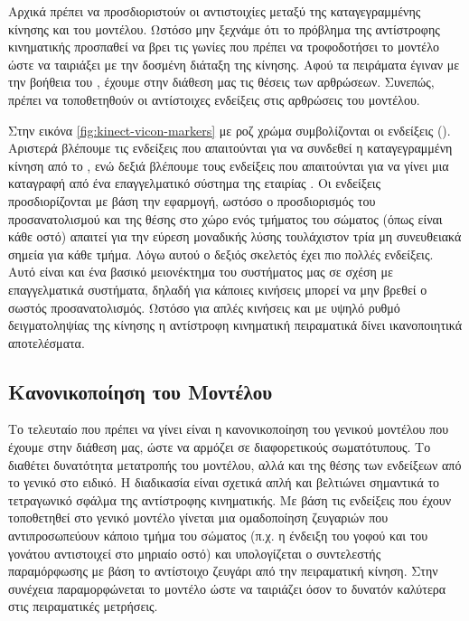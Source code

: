 Αρχικά πρέπει να προσδιοριστούν οι αντιστοιχίες μεταξύ της καταγεγραμμένης κίνησης και του μοντέλου. Ωστόσο μην ξεχνάμε ότι το πρόβλημα της αντίστροφης κινηματικής προσπαθεί να βρει τις γωνίες που πρέπει να τροφοδοτήσει το μοντέλο ώστε να ταιριάξει με την δοσμένη διάταξη της κίνησης. Αφού τα πειράματα έγιναν με την βοήθεια του , έχουμε στην διάθεση μας τις θέσεις των αρθρώσεων. Συνεπώς, πρέπει να τοποθετηθούν οι αντίστοιχες ενδείξεις στις αρθρώσεις του μοντέλου.

Στην εικόνα \ref{fig:kinect-vicon-markers} με ροζ χρώμα συμβολίζονται οι ενδείξεις (). Αριστερά βλέπουμε τις ενδείξεις που απαιτούνται για να συνδεθεί η καταγεγραμμένη κίνηση από το , ενώ δεξιά βλέπουμε τους ενδείξεις που απαιτούνται για να γίνει μια καταγραφή από ένα επαγγελματικό σύστημα της εταιρίας . Οι ενδείξεις προσδιορίζονται με βάση την εφαρμογή, ωστόσο ο προσδιορισμός του προσανατολισμού και της θέσης στο χώρο ενός τμήματος του σώματος (όπως είναι κάθε οστό) απαιτεί για την εύρεση μοναδικής λύσης τουλάχιστον τρία μη συνευθειακά σημεία για κάθε τμήμα. Λόγω αυτού ο δεξιός σκελετός έχει πιο πολλές ενδείξεις. Αυτό είναι και ένα βασικό μειονέκτημα του συστήματος μας σε σχέση με επαγγελματικά συστήματα, δηλαδή για κάποιες κινήσεις μπορεί να μην βρεθεί ο σωστός προσανατολισμός. Ωστόσο για απλές κινήσεις και με υψηλό ρυθμό δειγματοληψίας της κίνησης η αντίστροφη κινηματική πειραματικά δίνει ικανοποιητικά αποτελέσματα.

\subsection{Κανονικοποίηση του Μοντέλου}

Το τελευταίο που πρέπει να γίνει είναι η κανονικοποίηση του γενικού μοντέλου που έχουμε στην διάθεση μας, ώστε να αρμόζει σε διαφορετικούς σωματότυπους. Το  διαθέτει δυνατότητα μετατροπής του μοντέλου, αλλά και της θέσης των ενδείξεων από το γενικό στο ειδικό. Η διαδικασία είναι σχετικά απλή και βελτιώνει σημαντικά το τετραγωνικό σφάλμα της αντίστροφης κινηματικής. Με βάση τις ενδείξεις που έχουν τοποθετηθεί στο γενικό μοντέλο γίνεται μια ομαδοποίηση ζευγαριών που αντιπροσωπεύουν κάποιο τμήμα του σώματος (π.χ. η ένδειξη του γοφού και του γονάτου αντιστοιχεί στο μηριαίο οστό) και υπολογίζεται ο συντελεστής παραμόρφωσης με βάση το αντίστοιχο ζευγάρι από την πειραματική κίνηση. Στην συνέχεια παραμορφώνεται το μοντέλο ώστε να ταιριάζει όσον το δυνατόν καλύτερα στις πειραματικές μετρήσεις.

